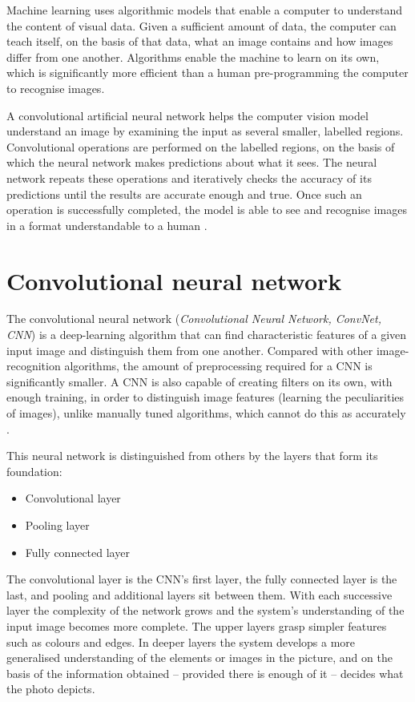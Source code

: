 Machine learning uses algorithmic models that enable a computer to understand the content of visual data. Given a sufficient amount of data, the computer can teach itself, on the basis of that data, what an image contains and how images differ from one another. Algorithms enable the machine to learn on its own, which is significantly more efficient than a human pre-programming the computer to recognise images.

A convolutional artificial neural network helps the computer vision model understand an image by examining the input as several smaller, labelled regions. Convolutional operations are performed on the labelled regions, on the basis of which the neural network makes predictions about what it sees. The neural network repeats these operations and iteratively checks the accuracy of its predictions until the results are accurate enough and true. Once such an operation is successfully completed, the model is able to see and recognise images in a format understandable to a human \cite{ref14}.

\section{Convolutional neural network}\label{convolutional-neural-network}

The convolutional neural network (\emph{Convolutional Neural Network, ConvNet, CNN}) is a deep-learning algorithm that can find characteristic features of a given input image and distinguish them from one another. Compared with other image-recognition algorithms, the amount of preprocessing required for a CNN is significantly smaller. A CNN is also capable of creating filters on its own, with enough training, in order to distinguish image features (learning the peculiarities of images), unlike manually tuned algorithms, which cannot do this as accurately \cite{ref15}.

This neural network is distinguished from others by the layers that form its foundation:

\begin{itemize}
\item
  Convolutional layer
\item
  Pooling layer
\item
  Fully connected layer
\end{itemize}

The convolutional layer is the CNN's first layer, the fully connected layer is the last, and pooling and additional layers sit between them. With each successive layer the complexity of the network grows and the system's understanding of the input image becomes more complete. The upper layers grasp simpler features such as colours and edges. In deeper layers the system develops a more generalised understanding of the elements or images in the picture, and on the basis of the information obtained -- provided there is enough of it -- decides what the photo depicts.

